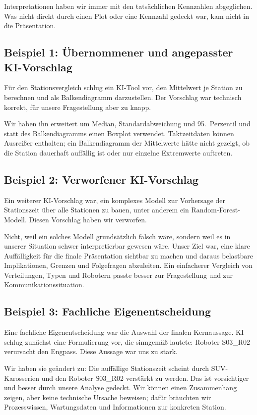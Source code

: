 \documentclass[a4paper, 11pt]{article}
\begin{document}
Interpretationen haben wir immer mit den tatsächlichen Kennzahlen abgeglichen. Was nicht direkt durch einen Plot oder eine Kennzahl gedeckt war, kam nicht in die Präsentation.

\subsection{Beispiel 1: Übernommener und angepasster KI-Vorschlag}

Für den Stationsvergleich schlug ein KI-Tool vor, den Mittelwert je Station zu berechnen und als Balkendiagramm darzustellen. Der Vorschlag war technisch korrekt, für unsere Fragestellung aber zu knapp.

Wir haben ihn erweitert um Median, Standardabweichung und 95.\ Perzentil und statt des Balkendiagramms einen Boxplot verwendet. Taktzeitdaten können Ausreißer enthalten; ein Balkendiagramm der Mittelwerte hätte nicht gezeigt, ob die Station dauerhaft auffällig ist oder nur einzelne Extremwerte auftreten.

\subsection{Beispiel 2: Verworfener KI-Vorschlag}

Ein weiterer KI-Vorschlag war, ein komplexes Modell zur Vorhersage der Stationszeit über alle Stationen zu bauen, unter anderem ein Random-Forest-Modell. Diesen Vorschlag haben wir verworfen.

Nicht, weil ein solches Modell grundsätzlich falsch wäre, sondern weil es in unserer Situation schwer interpretierbar gewesen wäre. Unser Ziel war, eine klare Auffälligkeit für die finale Präsentation sichtbar zu machen und daraus belastbare Implikationen, Grenzen und Folgefragen abzuleiten. Ein einfacherer Vergleich von Verteilungen, Typen und Robotern passte besser zur Fragestellung und zur Kommunikationssituation.

\subsection{Beispiel 3: Fachliche Eigenentscheidung}

Eine fachliche Eigenentscheidung war die Auswahl der finalen Kernaussage. KI schlug zunächst eine Formulierung vor, die sinngemäß lautete: \glqq Roboter S03\_R02 verursacht den Engpass.\grqq{} Diese Aussage war uns zu stark.

Wir haben sie geändert zu: \glqq Die auffällige Stationszeit scheint durch SUV-Karosserien und den Roboter S03\_R02 verstärkt zu werden.\grqq{} Das ist vorsichtiger und besser durch unsere Analyse gedeckt. Wir können einen Zusammenhang zeigen, aber keine technische Ursache beweisen; dafür bräuchten wir Prozesswissen, Wartungsdaten und Informationen zur konkreten Station.
\end{document}
